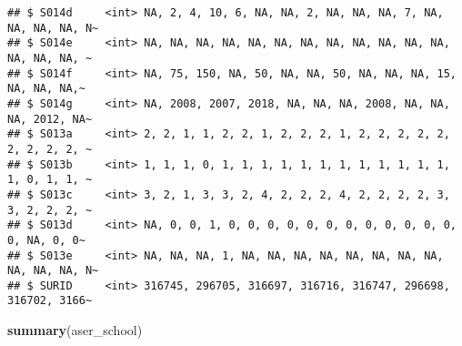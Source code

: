 \documentclass[
]{article}
\newenvironment{Shaded}{\begin{snugshade}}{\end{snugshade}}
\newcommand{\FunctionTok}[1]{\textcolor[rgb]{0.13,0.29,0.53}{\textbf{#1}}}
\newcommand{\NormalTok}[1]{#1}
\begin{document}
\begin{verbatim}
## $ S014d     <int> NA, 2, 4, 10, 6, NA, NA, 2, NA, NA, NA, 7, NA, NA, NA, NA, N~
## $ S014e     <int> NA, NA, NA, NA, NA, NA, NA, NA, NA, NA, NA, NA, NA, NA, NA, ~
## $ S014f     <int> NA, 75, 150, NA, 50, NA, NA, 50, NA, NA, NA, 15, NA, NA, NA,~
## $ S014g     <int> NA, 2008, 2007, 2018, NA, NA, NA, 2008, NA, NA, NA, 2012, NA~
## $ S013a     <int> 2, 2, 1, 1, 2, 2, 1, 2, 2, 2, 1, 2, 2, 2, 2, 2, 2, 2, 2, 2, ~
## $ S013b     <int> 1, 1, 1, 0, 1, 1, 1, 1, 1, 1, 1, 1, 1, 1, 1, 1, 1, 0, 1, 1, ~
## $ S013c     <int> 3, 2, 1, 3, 3, 2, 4, 2, 2, 2, 4, 2, 2, 2, 2, 3, 3, 2, 2, 2, ~
## $ S013d     <int> NA, 0, 0, 1, 0, 0, 0, 0, 0, 0, 0, 0, 0, 0, 0, 0, 0, NA, 0, 0~
## $ S013e     <int> NA, NA, NA, 1, NA, NA, NA, NA, NA, NA, NA, NA, NA, NA, NA, N~
## $ SURID     <int> 316745, 296705, 316697, 316716, 316747, 296698, 316702, 3166~
\end{verbatim}

\begin{Shaded}
\begin{Highlighting}[]
\FunctionTok{summary}\NormalTok{(aser\_school)}
\end{Highlighting}
\end{Shaded}
\end{document}

